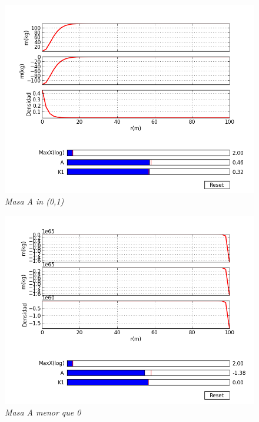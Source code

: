\documentclass[12pt]{book}
\begin{document}
\begin{figure}[!h]
 \centering
 \includegraphics[scale=0.7]{masa2.png}
 \caption{\emph{Masa A in (0,1) }}
 \label{Fig: 1}
\end{figure}


\begin{figure}[!h]
 \centering
 \includegraphics[scale=0.7]{masa3.png}
 \caption{\emph{Masa A menor que 0}}
 \label{Fig: 1}
\end{figure}
\end{document}
